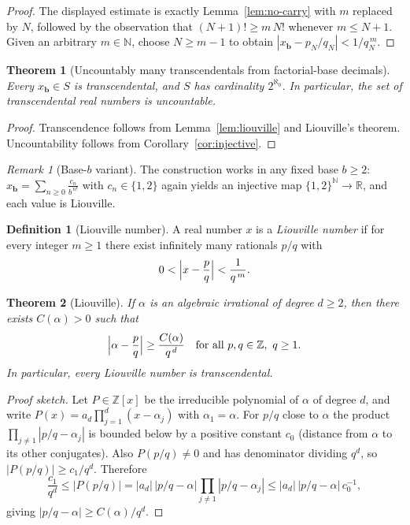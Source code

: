 \documentclass[11pt,a4paper]{article}
\newtheorem{theorem}{Theorem}
\theoremstyle{definition}
\theoremstyle{definition}
\newtheorem{definition}[exercise]{Definition}
\theoremstyle{plain}
\theoremstyle{remark}
\newtheorem{remark}[exercise]{Remark}
\begin{document}
\begin{proof}
	The displayed estimate is exactly Lemma~\ref{lem:no-carry} with $m$ replaced by $N$,
	followed by the observation that $(N+1)!\ge m\,N!$ whenever $m\le N+1$.
	Given an arbitrary $m\in\mathbb N$, choose $N\ge m-1$ to obtain
	$|x_{\mathbf b}-p_N/q_N|<1/q_N^{\,m}$.
\end{proof}

\begin{theorem}[Uncountably many transcendentals from factorial-base decimals]
	Every $x_{\mathbf b}\in S$ is transcendental, and $S$ has cardinality $2^{\aleph_0}$.
	In particular, the set of transcendental real numbers is uncountable.
\end{theorem}

\begin{proof}
	Transcendence follows from Lemma~\ref{lem:liouville} and Liouville's theorem.
	Uncountability follows from Corollary~\ref{cor:injective}.
\end{proof}

\begin{remark}[Base-$b$ variant]
	The construction works in any fixed base $b\ge2$:
	$\displaystyle x_{\mathbf b}=\sum_{n\ge0}\frac{c_n}{b^{\,n!}}$ with $c_n\in\{1,2\}$
	again yields an injective map $\{1,2\}^{\mathbb N}\to\mathbb R$, and each value is Liouville.
\end{remark}


\begin{definition}[Liouville number]
	A real number $x$ is a \emph{Liouville number} if for every integer $m\ge1$ there exist infinitely many rationals $p/q$ with
	\[
	0<\Bigl|x-\frac{p}{q}\Bigr|<\frac{1}{q^{\,m}}.
	\]
\end{definition}

\begin{theorem}[Liouville]
	If $\alpha$ is an algebraic irrational of degree $d\ge2$, then there exists $C(\alpha)>0$ such that
	\[
	\Bigl|\alpha-\frac{p}{q}\Bigr|\ge \frac{C(\alpha)}{q^{\,d}}
	\quad\text{for all }p,q\in\mathbb Z,\ q\ge1.
	\]
	In particular, every Liouville number is transcendental.
\end{theorem}

\begin{proof}[Proof sketch]
	Let $P\in\mathbb Z[x]$ be the irreducible polynomial of $\alpha$ of degree $d$, and write
	$P(x)=a_d\prod_{j=1}^d(x-\alpha_j)$ with $\alpha_1=\alpha$. For $p/q$ close to $\alpha$ the product
	$\prod_{j\ne1}|p/q-\alpha_j|$ is bounded below by a positive constant $c_0$ (distance from $\alpha$ to its other conjugates).
	Also $P(p/q)\ne0$ and has denominator dividing $q^d$, so $|P(p/q)|\ge c_1/q^d$. Therefore
	\[
	\frac{c_1}{q^d}\le |P(p/q)|=|a_d|\,|p/q-\alpha|\prod_{j\ne1}|p/q-\alpha_j|
	\le |a_d|\,|p/q-\alpha|\,c_0^{-1},
	\]
	giving $|p/q-\alpha|\ge C(\alpha)/q^d$.
\end{proof}
\end{document}
